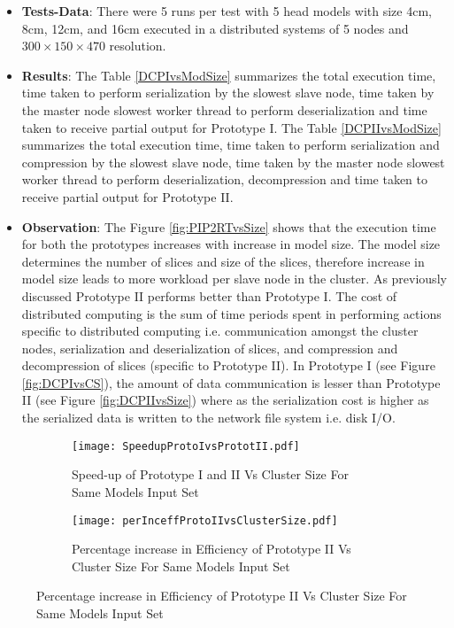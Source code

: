 \begin{enumerate}
\begin{itemize}
\item \textbf{Tests-Data}: There were 5 runs per test with 5 head models with size 4cm, 8cm, 12cm, and 16cm executed in a distributed systems of 5 nodes and \begin{math}300 \times 150 \times 470 \end{math} resolution.  
\item \textbf{Results}: The Table \ref{DCPIvsModSize} summarizes the total execution time, time taken to perform serialization by the slowest slave node, time taken by the master node slowest worker thread to perform deserialization and time taken to receive partial output for Prototype I. The Table \ref{DCPIIvsModSize} summarizes the total execution time, time taken to perform serialization and compression by the slowest slave node, time taken by the master node slowest worker thread to perform deserialization, decompression and time taken to receive partial output for Prototype II.
\item \textbf{Observation}: The Figure \ref{fig:PIP2RTvsSize} shows that the execution time for both the prototypes increases with increase in model size. The model size determines the number of slices and size of the slices, therefore increase in model size leads to more workload per slave node in the cluster. As previously discussed Prototype II performs better than Prototype I. The cost of distributed computing is the sum of time periods spent in performing actions specific to distributed computing i.e. communication amongst the cluster nodes, serialization and deserialization of slices, and compression and decompression of slices (specific to Prototype II). In Prototype I (see Figure \ref{fig:DCPIvsCS}), the amount of data communication is lesser than Prototype II (see Figure \ref{fig:DCPIIvsSize}) where as the serialization cost is higher as the serialized data is written to the network file system i.e. disk I/O.    
\end{itemize}
\end{enumerate}


\begin{figure}
\centering
\captionsetup[subfigure]{labelformat=empty}
\begin{subfigure}
\centering
\texttt{[image: SpeedupProtoIvsPrototII.pdf]}
\label{fig:SpeedupProtoIvsPrototII}
\caption{Speed-up of Prototype I and II Vs Cluster Size For Same Models Input Set}
\end{subfigure}
\begin{subfigure}
\centering
\texttt{[image: perInceffProtoIIvsClusterSize.pdf]}
\caption{ Percentage increase in Efficiency of Prototype II Vs Cluster Size For Same Models Input Set}
\label{fig:perInceffProtoIIvsClusterSize}
\end{subfigure}
\end{figure}


